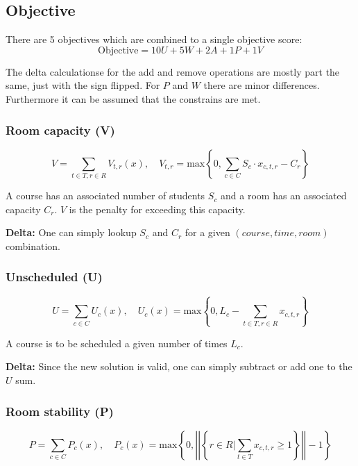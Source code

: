 \subsection{Objective}

There are 5 objectives which are combined to a single objective score:
\begin{equation}
\mathrm{Objective} = 10 U + 5 W + 2 A + 1 P + 1 V
\end{equation}

The delta calculationse for the add and remove operations are mostly part the same, just with the sign flipped. For $P$ and $W$ there are minor differences. Furthermore it can be assumed that the constrains are met.

\subsubsection{Room capacity (V)}
\begin{equation}
V = \sum_{t \in T, r \in R} V_{t, r}(x), \quad V_{t, r} = \mathrm{max}\left\{ 0, \sum_{c \in C} S_c \cdot x_{c, t, r} - C_r \right\}
\end{equation}

A course has an associated number of students $S_c$ and a room has an associated capacity $C_r$. $V$ is the penalty for exceeding this capacity.

\textbf{Delta: } One can simply lookup $S_c$ and $C_r$ for a given $(course, time, room)$ combination.

\subsubsection{Unscheduled (U)}
\begin{equation}
U = \sum_{c \in C} U_c(x), \quad U_c(x) = \mathrm{max}\left\{ 0, L_c - \sum_{t \in T, r \in R} x_{c, t, r}\right\}
\end{equation}

A course is to be scheduled a given number of times $L_c$.

\textbf{Delta: } Since the new solution is valid, one can simply subtract or add one to the $U$ sum.

\subsubsection{Room stability (P)}
\begin{equation}
P = \sum_{c \in C} P_c(x), \quad P_c(x) = \mathrm{max}\left\{ 0, \left|\left| \left\{ r \in R \Big\vert \sum_{t \in T} x_{c, t, r} \ge 1 \right\} \right|\right| - 1 \right\}
\end{equation}

